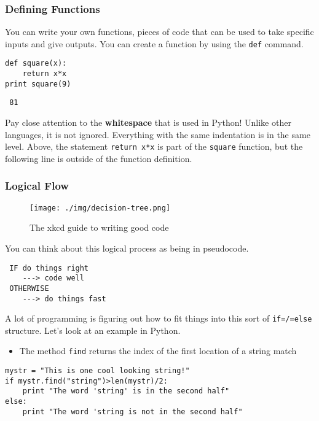 \documentclass[11pt]{article}
\begin{document}
\subsubsection{Defining Functions}
\label{sec-2-3-5}


You can write your own functions, pieces of code that can be used to
take specific inputs and give outputs.  You can create a function by
using the \texttt{def} command.


\begin{verbatim}
def square(x):
    return x*x
print square(9)
\end{verbatim}

\begin{verbatim}
 81
\end{verbatim}

Pay close attention to the \textbf{whitespace} that is used in Python!
Unlike other languages, it is not ignored.  Everything with the same
indentation is in the same level.  Above, the statement \texttt{return x*x}
is part of the \texttt{square} function, but the following line is outside of
the function definition.
\subsubsection{Logical Flow}
\label{sec-2-3-6}

    \begin{figure}[htb]
    \centering
    \texttt{[image: ./img/decision-tree.png]}
    \caption{The xkcd guide to writing good code}
    \end{figure}

You can think about this logical process as being in pseudocode.

\begin{verbatim}
 IF do things right
    ---> code well
 OTHERWISE
    ---> do things fast
\end{verbatim}

A lot of programming is figuring out how to fit things into this sort
of \texttt{if=/=else} structure.  Let's look at an example in Python.

\begin{itemize}
\item The method \texttt{find} returns the index of the first location of a
  string match
\end{itemize}


\begin{verbatim}
mystr = "This is one cool looking string!"
if mystr.find("string")>len(mystr)/2:
    print "The word 'string' is in the second half"
else:
    print "The word 'string is not in the second half"
\end{verbatim}
\end{document}
